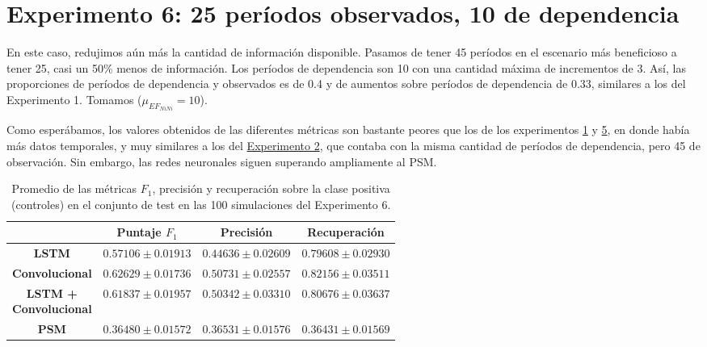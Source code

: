 \documentclass[../../main.tex]{subfiles}
\begin{document}
\section{Experimento 6: 25 períodos observados, 10 de dependencia} \label{sec:exp6}
En este caso, redujimos aún más la cantidad de información disponible. Pasamos de tener 45
períodos en el escenario más beneficioso a tener 25, casi un 50\% menos de información.
Los períodos de dependencia son 10 con una cantidad máxima de incrementos de 3. Así, las
proporciones de períodos de dependencia y observados es de 0.4 y de aumentos sobre
períodos de dependencia de 0.33, similares a los del Experimento 1. Tomamos
(\(\mu_{{EF}_{NiNi}} = 10\)).

Como esperábamos, los valores obtenidos de las diferentes métricas son bastante peores que
los de los experimentos \hyperref[sec:exp1]{1} y \hyperref[sec:exp5]{5}, en donde había
más datos temporales, y muy similares a los del \hyperref[sec:exp2]{Experimento 2}, que
contaba con la misma cantidad de períodos de dependencia, pero 45 de observación. Sin
embargo, las redes neuronales siguen superando ampliamente al PSM.

\begin{table}[H]
    \centering
    \renewcommand{\arraystretch}{1.2}
    \begin{tabular}{|c|c|c|c|}
        \hline
         & \textbf{Puntaje} \(F_1\) & \textbf{Precisión} & \textbf{Recuperación} \\ \hline\hline
        \textbf{LSTM}
            & $0.57106 \pm 0.01913$ & $0.44636 \pm 0.02609$ & $0.79608 \pm 0.02930$ \\ \hline
        \textbf{Convolucional}
            & $\mathbf{0.62629 \pm 0.01736}$ & $\mathbf{0.50731 \pm 0.02557}$ & $\mathbf{0.82156 \pm 0.03511}$ \\ \hline
        \makecell{\textbf{LSTM +} \\ \textbf{Convolucional}}
            & $0.61837 \pm 0.01957$ & $0.50342 \pm 0.03310$ & $0.80676 \pm 0.03637$ \\ \hline
        \textbf{PSM}
            & $0.36480 \pm 0.01572$ & $0.36531 \pm 0.01576$ & $0.36431 \pm 0.01569$ \\
        \hline
    \end{tabular}
    \caption{Promedio de las métricas \(F_1\), precisión y recuperación sobre la
    clase positiva (controles) en el conjunto de test en las 100 simulaciones del
    Experimento 6.}
    \label{tab:results_exp6}
\end{table}
\end{document}
